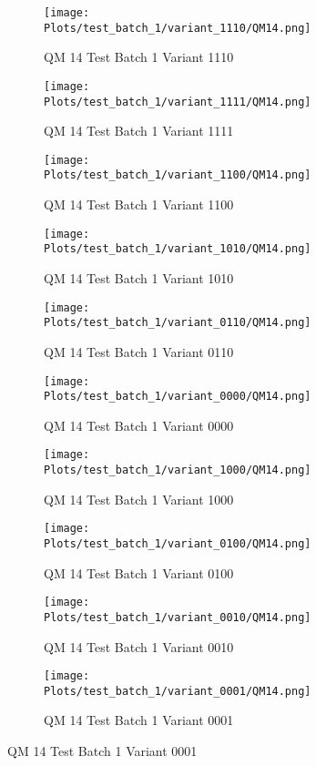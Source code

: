 \documentclass{DissertateFigs}
\begin{document}
\begin{figure}[t!]
    \begin{subfigure}{0.47\textwidth}
    \texttt{[image: Plots/test\_batch\_1/variant\_1110/QM14.png]}
    \caption{QM 14 Test Batch 1 Variant 1110}
    \end{subfigure}
    \begin{subfigure}{0.47\textwidth}
    \texttt{[image: Plots/test\_batch\_1/variant\_1111/QM14.png]}
    \caption{QM 14 Test Batch 1 Variant 1111}
    \end{subfigure}

\medskip

    \begin{subfigure}{0.47\textwidth}
    \texttt{[image: Plots/test\_batch\_1/variant\_1100/QM14.png]}
    \caption{QM 14 Test Batch 1 Variant 1100}
    \end{subfigure}
    \begin{subfigure}{0.47\textwidth}
    \texttt{[image: Plots/test\_batch\_1/variant\_1010/QM14.png]}
    \caption{QM 14 Test Batch 1 Variant 1010}
    \end{subfigure}

\medskip

    \begin{subfigure}{0.47\textwidth}
    \texttt{[image: Plots/test\_batch\_1/variant\_0110/QM14.png]}
    \caption{QM 14 Test Batch 1 Variant 0110}
    \end{subfigure}
    \begin{subfigure}{0.47\textwidth}
    \texttt{[image: Plots/test\_batch\_1/variant\_0000/QM14.png]}
    \caption{QM 14 Test Batch 1 Variant 0000}
    \end{subfigure}

\medskip

    \begin{subfigure}{0.47\textwidth}
    \texttt{[image: Plots/test\_batch\_1/variant\_1000/QM14.png]}
    \caption{QM 14 Test Batch 1 Variant 1000}
    \end{subfigure}
    \begin{subfigure}{0.47\textwidth}
    \texttt{[image: Plots/test\_batch\_1/variant\_0100/QM14.png]}
    \caption{QM 14 Test Batch 1 Variant 0100}
    \end{subfigure}

\medskip

    \begin{subfigure}{0.47\textwidth}
    \texttt{[image: Plots/test\_batch\_1/variant\_0010/QM14.png]}
    \caption{QM 14 Test Batch 1 Variant 0010}
    \end{subfigure}
    \begin{subfigure}{0.47\textwidth}
    \texttt{[image: Plots/test\_batch\_1/variant\_0001/QM14.png]}
    \caption{QM 14 Test Batch 1 Variant 0001}
    \end{subfigure}


\end{figure}
\end{document}
